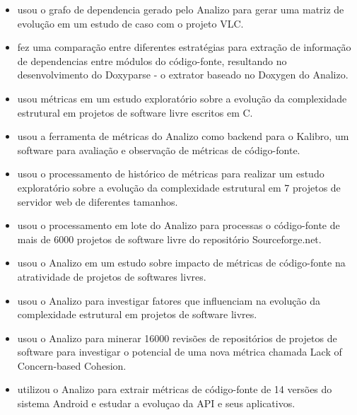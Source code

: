 \begin{itemize}

  \item \cite{amaral2009analise} usou o grafo de dependencia gerado pelo Analizo para
  gerar uma matriz de evolução em um estudo de caso com o projeto VLC.

  \item \cite{costa2009extracao} fez uma comparação entre diferentes estratégias para
  extração de informação de dependencias entre módulos do código-fonte,
  resultando no desenvolvimento do Doxyparse - o extrator baseado no Doxygen do
  Analizo.

  \item \cite{terceiro2009structural} usou métricas em um estudo exploratório sobre a
  evolução da complexidade estrutural em projetos de software livre escritos em
  C.

  \item \cite{morais2009kalibro} usou a ferramenta de métricas do Analizo como backend
  para o Kalibro, um software para avaliação e observação de métricas de código-fonte.
  
  \item \cite{terceiro2010empirical} usou o processamento de histórico de métricas para
  realizar um estudo exploratório sobre a evolução da complexidade estrutural em
  7 projetos de servidor web de diferentes tamanhos.

  \item \cite{meirelles2010astudy} usou o processamento em lote do Analizo para
  processas o código-fonte de mais de 6000 projetos de software livre do
  repositório Sourceforge.net.

  \item \cite{meirelles2011semiautomatic} usou o Analizo em um estudo sobre impacto de
  métricas de código-fonte na atratividade de projetos de softwares livres.

  \item \cite{terceiro2012understanding} usou o Analizo para investigar fatores
  que influenciam na evolução da complexidade estrutural em projetos de software
  livres.

  \item \cite{silva2012concernbased} usou o Analizo para minerar 16000 revisões de
  repositórios de projetos de software para investigar o potencial de uma nova
  métrica chamada Lack of Concern-based Cohesion.

  \item \cite{ronaldo2015estudo} utilizou o Analizo para extrair métricas de
  código-fonte de 14 versões do sistema Android e estudar a evoluçao da API e
  seus aplicativos.

\end{itemize}


